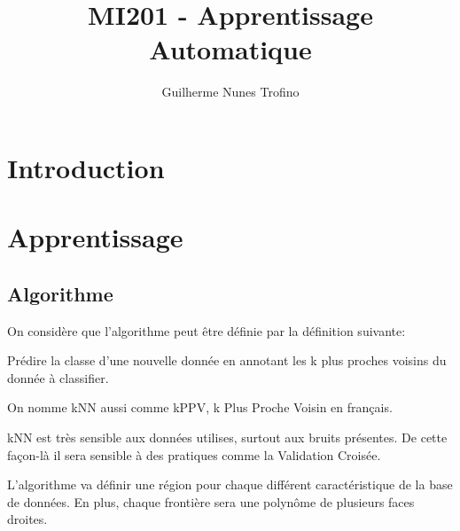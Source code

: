 \documentclass{article}
\title{MI201 - Apprentissage Automatique}
\author{Guilherme Nunes Trofino}
\begin{document}
\maketitle
\setlength{\parindent}{0pt}

\newpage\tableofcontents

\section{Introduction}

% 
% 

\section{Apprentissage}
\subsection{Algorithme}
On considère que l'algorithme peut être définie par la définition suivante:
\begin{definition}
    Prédire la classe d'une nouvelle donnée en annotant les k plus proches voisins du donnée à classifier.
\end{definition}
\begin{remark}
    On nomme kNN aussi comme kPPV, k Plus Proche Voisin en français.
\end{remark}
\begin{remark}
    kNN est très sensible aux données utilises, surtout aux bruits présentes. De cette façon-là il sera sensible à des pratiques comme la Validation Croisée.
\end{remark}
L'algorithme va définir une région pour chaque différent caractéristique de la base de données. En plus, chaque frontière sera une polynôme de plusieurs faces droites.\\
\end{document}
